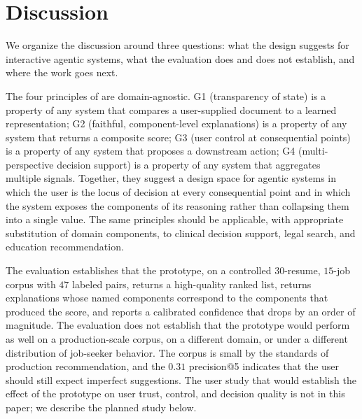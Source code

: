 \section{Discussion}\label{sec:8}

We organize the discussion around three questions: what the design suggests for interactive agentic systems, what the evaluation does and does not establish, and where the work goes next.

The four principles of  are domain-agnostic.
G1 (transparency of state) is a property of any system that compares a user-supplied document to a learned representation; G2 (faithful, component-level explanations) is a property of any system that returns a composite score; G3 (user control at consequential points) is a property of any system that proposes a downstream action; G4 (multi-perspective decision support) is a property of any system that aggregates multiple signals.
Together, they suggest a design space for agentic systems in which the user is the locus of decision at every consequential point and in which the system exposes the components of its reasoning rather than collapsing them into a single value.
The same principles should be applicable, with appropriate substitution of domain components, to clinical decision support, legal search, and education recommendation.

The evaluation establishes that the prototype, on a controlled $30$-resume, $15$-job corpus with $47$ labeled pairs, returns a high-quality ranked list, returns explanations whose named components correspond to the components that produced the score, and reports a calibrated confidence that drops \ece{} by an order of magnitude.
The evaluation does not establish that the prototype would perform as well on a production-scale corpus, on a different domain, or under a different distribution of job-seeker behavior.
The corpus is small by the standards of production recommendation, and the $0.31$ precision@5 indicates that the user should still expect imperfect suggestions.
The user study that would establish the effect of the prototype on user trust, control, and decision quality is not in this paper; we describe the planned study below.


